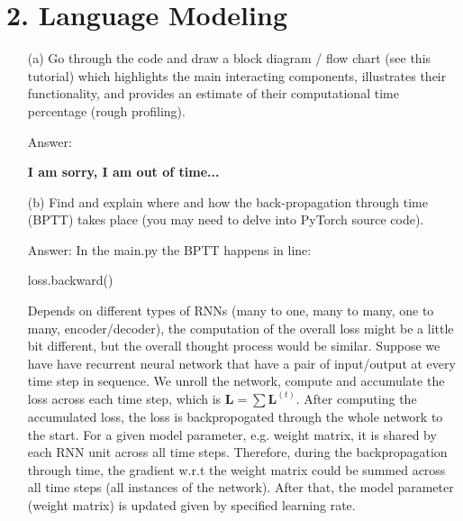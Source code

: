\documentclass[12pt,letterpaper]{article}
\begin{document}
\section*{2. Language Modeling}
\begin{itemize}
    \item[(a)]Go through the code and draw a block diagram / flow chart (see this tutorial) which highlights the main interacting components, illustrates their functionality, and provides an estimate of their computational time percentage (rough profiling).
    
    Answer:
    
    \textbf{I am sorry, I am out of time...}
    
    \item[(b)]Find and explain where and how the back-propagation through time (BPTT) takes place (you may need to delve into PyTorch source code).
    
    Answer: In the main.py the BPTT happens in line:
    \begin{python}
        loss.backward()
    \end{python}
    
    Depends on different types of RNNs (many to one, many to many, one to many, encoder/decoder), the computation of the overall loss might be a little bit different, but the overall thought process would be similar. Suppose we have have recurrent neural network that have a pair of input/output at every time step in sequence. We unroll the network, compute and accumulate the loss across each time step, which is $\textbf{L} = \sum \textbf{L}^{(t)}$. After computing the accumulated loss, the loss is backpropogated through the whole network to the start. For a given model parameter, e.g. weight matrix, it is shared by each RNN unit across all time steps. Therefore, during the backpropagation through time, the gradient w.r.t the weight matrix could be summed across all time steps (all instances of the network). After that, the model parameter (weight matrix) is updated given by specified learning rate.
    

\end{itemize}
\end{document}
